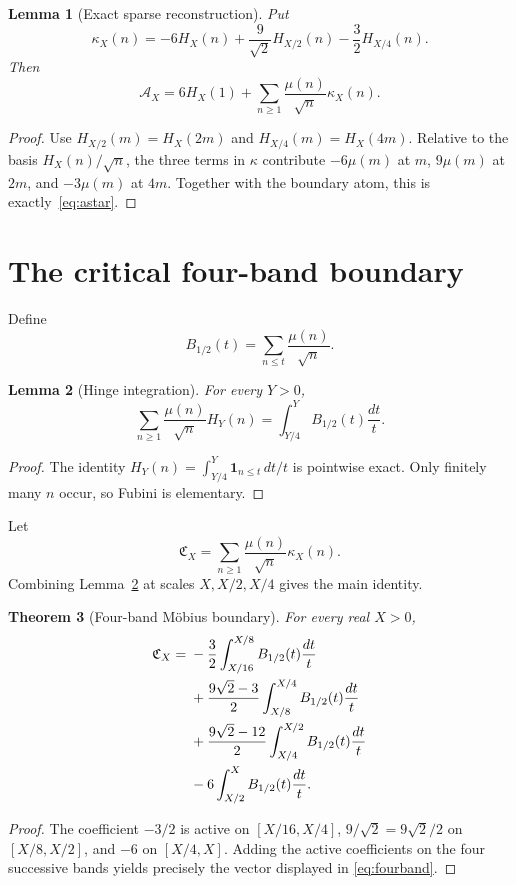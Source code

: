 \documentclass[11pt]{article}
\newtheorem{theorem}{Theorem}[section]
\newtheorem{lemma}[theorem]{Lemma}
\newcommand{\one}{\mathbf 1}
\newcommand{\Acal}{\mathcal A}
\newcommand{\Ccal}{\mathfrak C}
\begin{document}
\begin{lemma}[Exact sparse reconstruction]\label{lem:sparse}
Put
\[
 \kappa_X(n)=-6H_X(n)+\frac9{\sqrt2}H_{X/2}(n)
              -\frac32H_{X/4}(n).
\]
Then
\begin{equation}\label{eq:kappa}
 \boxed{\Acal_X=6H_X(1)+\sum_{n\ge1}\frac{\mu(n)}{\sqrt n}\kappa_X(n).}
\end{equation}
\end{lemma}
\begin{proof}
Use $H_{X/2}(m)=H_X(2m)$ and $H_{X/4}(m)=H_X(4m)$.  Relative to the basis
$H_X(n)/\sqrt n$, the three terms in $\kappa$ contribute
$-6\mu(m)$ at $m$, $9\mu(m)$ at $2m$, and $-3\mu(m)$ at $4m$.
Together with the boundary atom, this is exactly~\eqref{eq:astar}.
\end{proof}

\section{The critical four-band boundary}
Define
\[
 B_{1/2}(t)=\sum_{n\le t}\frac{\mu(n)}{\sqrt n}.
\]

\begin{lemma}[Hinge integration]\label{lem:hinge}
For every $Y>0$,
\[
 \sum_{n\ge1}\frac{\mu(n)}{\sqrt n}H_Y(n)
 =\int_{Y/4}^{Y}B_{1/2}(t)\frac{dt}{t}.
\]
\end{lemma}
\begin{proof}
The identity
$H_Y(n)=\int_{Y/4}^{Y}\one_{n\le t}\,dt/t$ is pointwise exact.  Only finitely
many $n$ occur, so Fubini is elementary.
\end{proof}

Let
\[
 \Ccal_X=\sum_{n\ge1}\frac{\mu(n)}{\sqrt n}\kappa_X(n).
\]
Combining Lemma~\ref{lem:hinge} at scales $X,X/2,X/4$ gives the main identity.

\begin{theorem}[Four-band M\"obius boundary]\label{thm:c4}
For every real $X>0$,
\begin{align}
 \Ccal_X={}&-\frac32\int_{X/16}^{X/8}B_{1/2}(t)\frac{dt}{t}\notag\\
 &+\frac{9\sqrt2-3}{2}\int_{X/8}^{X/4}B_{1/2}(t)\frac{dt}{t}\notag\\
 &+\frac{9\sqrt2-12}{2}\int_{X/4}^{X/2}B_{1/2}(t)\frac{dt}{t}\notag\\
 &-6\int_{X/2}^{X}B_{1/2}(t)\frac{dt}{t}.
 \label{eq:fourband}
\end{align}
\end{theorem}
\begin{proof}
The coefficient $-3/2$ is active on $[X/16,X/4]$, $9/\sqrt2=9\sqrt2/2$
on $[X/8,X/2]$, and $-6$ on $[X/4,X]$.  Adding the active coefficients on
the four successive bands yields precisely the vector displayed in
\eqref{eq:fourband}.
\end{proof}
\end{document}
